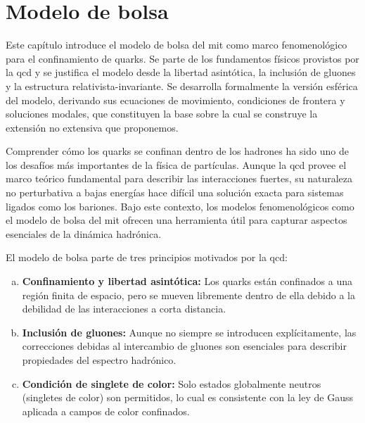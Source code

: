 \chapter{Modelo de bolsa}
\label{ch-BagModel}

\pagestyle{fancy}
\fancyhf{}
\fancyhead[LE]{\nouppercase{\textbf{\leftmark}\hfill\textit{\rightmark}}}
\fancyhead[RO]{\nouppercase{\textit{\rightmark}\hfill\textbf{\leftmark}}}

\begin{chaptersummary}
    Este capítulo introduce el modelo de bolsa del \gls{mit} como marco fenomenológico para el confinamiento de quarks. Se parte de los fundamentos físicos provistos por la \gls{qcd} y se justifica el modelo desde la libertad asintótica, la inclusión de gluones y la estructura relativista-invariante. Se desarrolla formalmente la versión esférica del modelo, derivando sus ecuaciones de movimiento, condiciones de frontera y soluciones modales, que constituyen la base sobre la cual se construye la extensión no extensiva que proponemos.
\end{chaptersummary}

Comprender cómo los quarks se confinan dentro de los hadrones ha sido uno de los desafíos más importantes de la física de partículas. Aunque la \gls{qcd} provee el marco teórico fundamental para describir las interacciones fuertes, su naturaleza no perturbativa a bajas energías hace difícil una solución exacta para sistemas ligados como los bariones. Bajo este contexto, los modelos fenomenológicos como el modelo de bolsa del \gls{mit} ofrecen una herramienta útil para capturar aspectos esenciales de la dinámica hadrónica.

El modelo de bolsa parte de tres principios motivados por la \gls{qcd}:

\begin{enumerate}[a)]
\item \textbf{Confinamiento y libertad asintótica:} Los quarks están confinados a una región finita de espacio, pero se mueven libremente dentro de ella debido a la debilidad de las interacciones a corta distancia.
\item \textbf{Inclusión de gluones:} Aunque no siempre se introducen explícitamente, las correcciones debidas al intercambio de gluones son esenciales para describir propiedades del espectro hadrónico.
\item \textbf{Condición de singlete de color:} Solo estados globalmente neutros (singletes de color) son permitidos, lo cual es consistente con la ley de Gauss aplicada a campos de color confinados.
\end{enumerate}

